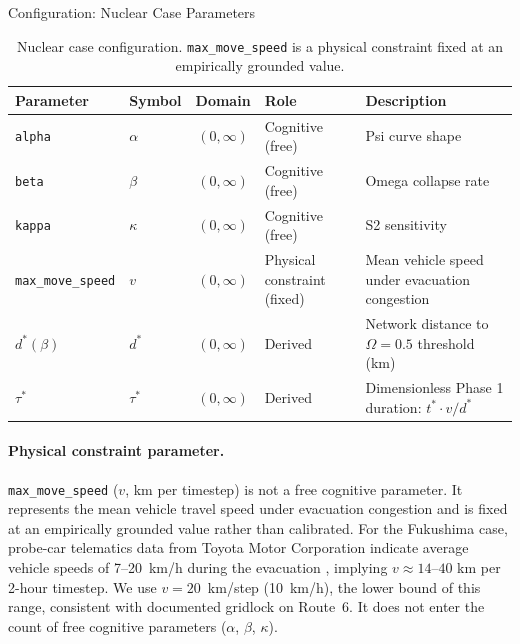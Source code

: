 \documentclass[aspectratio=169]{beamer}
\begin{document}
\begin{frame}{Configuration: Nuclear Case Parameters}

\begin{table}[h]
\small
\begin{tabular}{llcll}
\toprule
Parameter & Symbol & Domain & Role & Description \\
\midrule
\texttt{alpha} & $\alpha$ & $(0, \infty)$ & Cognitive (free) & Psi curve shape \\
\texttt{beta} & $\beta$ & $(0, \infty)$ & Cognitive (free) & Omega collapse rate \\
\texttt{kappa} & $\kappa$ & $(0, \infty)$ & Cognitive (free) & S2 sensitivity \\
\texttt{max\_move\_speed} & $v$ & $(0, \infty)$ &
Physical constraint (fixed) & Mean vehicle speed under evacuation congestion \\
$d^*(\beta)$ & $d^*$ & $(0, \infty)$ & Derived & Network distance to $\Omega=0.5$ threshold (km) \\
$\tau^*$ & $\tau^*$ & $(0, \infty)$ & Derived & Dimensionless Phase 1 duration: $t^* \cdot v / d^*$ \\
\bottomrule
\end{tabular}
\caption{Nuclear case configuration. \texttt{max\_move\_speed} is a physical
constraint fixed at an empirically grounded value.}
\end{table}

\vspace{0.5em}
\paragraph{Physical constraint parameter.} \texttt{max\_move\_speed}
($v$, km per timestep) is not a free cognitive parameter. It represents
the mean vehicle travel speed under evacuation congestion and is fixed
at an empirically grounded value rather than calibrated. For the
Fukushima case, probe-car telematics data from Toyota Motor Corporation
indicate average vehicle speeds of 7--20~km/h during the evacuation
\citep{Shimazaki2012}, implying $v \approx 14$--$40$ km per 2-hour
timestep. We use $v = 20$~km/step (10~km/h), the lower bound of this
range, consistent with documented gridlock on Route~6. It does not
enter the count of free cognitive parameters ($\alpha$, $\beta$, $\kappa$).

\end{frame}
\end{document}
